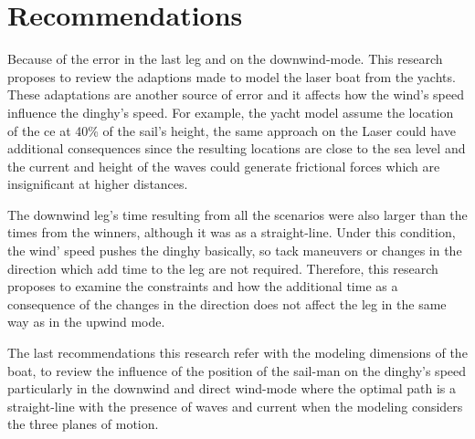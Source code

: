 \section{Recommendations}
Because of the error in the last leg and on the downwind-mode. This research proposes to review the adaptions made to model the laser boat from the yachts. These adaptations are another source of error and it affects how the wind's speed influence the dinghy's speed. For example, the yacht model assume the location of the \acrshort{ce} at 40\% of the sail's height, the same approach on the Laser could have additional consequences since the resulting locations are close to the sea level and the current and height of the waves could generate frictional forces which are insignificant at higher distances. \par 
The downwind leg's time resulting from all the scenarios were also larger than the times from the winners, although it was as a straight-line. Under this condition, the wind' speed pushes the dinghy basically, so tack maneuvers or changes in the direction which add time to the leg are not required. Therefore, this research proposes to examine the constraints and how the additional time as a consequence of the changes in the direction does not affect the leg in the same way as in the upwind mode. \par 
The last recommendations this research refer with the modeling dimensions of the boat, to review the influence of the position of the sail-man on the dinghy's speed particularly in the downwind and direct wind-mode where the optimal path is a straight-line with the presence of waves and current when the modeling considers the three planes of motion. \par  %
 